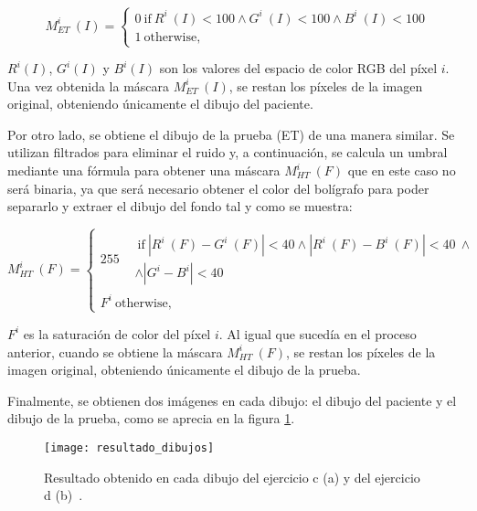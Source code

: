 \begin{equation}
	M^{i}_{ET}\ (I) = \left\lbrace\begin{array}{ll}
0~\text{if}~R^{i}~(I)<100\wedge G^{i}~(I)<100\wedge B^{i}~(I)<100 \\ 1~\text{otherwise,} \end{array}\right.
\end{equation}

\(R^{i}(I)\), \(G^{i}(I)\) y \(B^{i}(I)\) son los valores del espacio de color RGB del píxel \(i\). Una vez obtenida la máscara \(M^{i}_{ET}\ (I)\), se restan los píxeles de la imagen original, obteniendo únicamente el dibujo del paciente.

Por otro lado, se obtiene el dibujo de la prueba (ET) de una manera similar. Se utilizan filtrados para eliminar el ruido y, a continuación, se calcula un umbral mediante una fórmula para obtener una máscara \(M^{i}_{HT}\ (F)\) que en este caso no será binaria, ya que será necesario obtener el color del bolígrafo para poder separarlo y extraer el dibujo del fondo tal y como se muestra:
 
\begin{equation}
	M^{i}_{HT}\ (F) = \left\lbrace\begin{array}{ll}
		255\begin{split}&~\text{if}~|R^{i}~(F)-G^{i}~(F)|<40\wedge |R^{i}~(F)-B^{i}~(F)|<40~\wedge \\ & \wedge|G^{i}-B^{i}|<40 \end{split} \\ F^i~\text{otherwise,} \end{array}\right.
\end{equation}

\(F^{i}\) es la saturación de color del píxel \(i\). Al igual que sucedía en el proceso anterior, cuando se  obtiene la máscara \(M^{i}_{HT}\ (F)\), se restan los píxeles de la imagen original, obteniendo únicamente el dibujo de la prueba.

Finalmente, se obtienen dos imágenes en cada dibujo: el dibujo del paciente y el dibujo de la prueba, como se aprecia en la figura \ref{fig:resultado}.

\begin{figure}[ht]
	\texttt{[image: resultado\_dibujos]}
	\caption[Resultado obtenido en cada dibujo de los ejercicios c y d.]{Resultado obtenido en cada dibujo del ejercicio c (a) y del ejercicio d (b)~\cite{pereira2016new}.}
	\label{fig:resultado}
\end{figure}

